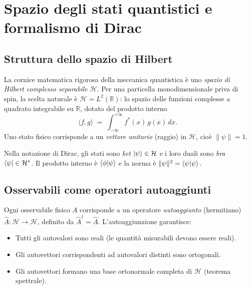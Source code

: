 \documentclass[12pt, a4paper]{article}
\begin{document}
\clearpage

\appendix

\section{Spazio degli stati quantistici e formalismo di Dirac}
\label{app:hilbert}

\subsection{Struttura dello spazio di Hilbert}

La cornice matematica rigorosa della meccanica quantistica è uno
\emph{spazio di Hilbert complesso separabile} $\mathcal{H}$.  Per una
particella monodimensionale priva di spin, la scelta naturale è
$\mathcal{H} = L^2(\mathbb{R})$: lo spazio delle funzioni complesse
a quadrato integrabile su $\mathbb{R}$, dotato del prodotto interno
\begin{equation}
  \langle f, g\rangle \;=\; \int_{-\infty}^{+\infty} f^*(x)\,g(x)\,dx.
\end{equation}
Uno stato fisico corrisponde a un \emph{vettore unitario} (raggio) in
$\mathcal{H}$, cioè $\|\psi\| = 1$.

Nella notazione di Dirac, gli stati sono \emph{ket}
$\ket{\psi} \in \mathcal{H}$ e i loro duali sono \emph{bra}
$\bra{\psi} \in \mathcal{H}^*$.  Il prodotto interno è
$\braket{\phi}{\psi}$ e la norma è
$\|\psi\|^2 = \braket{\psi}{\psi}$.

\subsection{Osservabili come operatori autoaggiunti}

Ogni osservabile fisico $A$ corrisponde a un operatore
\emph{autoaggiunto} (hermitiano)
$\hat{A}: \mathcal{H} \to \mathcal{H}$, definito da
$\hat{A}^\dagger = \hat{A}$.  L'autoaggiunzione garantisce:
\begin{itemize}
  \item Tutti gli autovalori sono reali (le quantità misurabili devono
        essere reali).
  \item Gli autovettori corrispondenti ad autovalori distinti sono
        ortogonali.
  \item Gli autovettori formano una base ortonormale completa di
        $\mathcal{H}$ (teorema spettrale).
\end{itemize}
\end{document}
